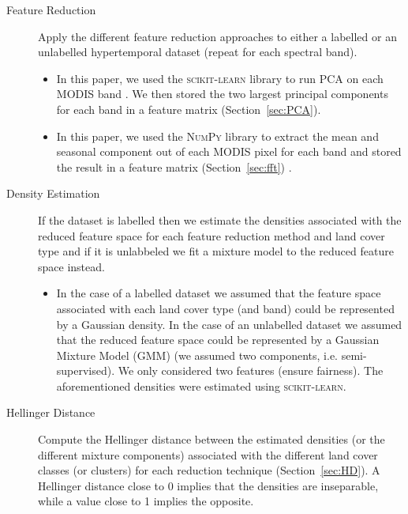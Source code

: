 \documentclass{article}
\begin{document}
\begin{description}
 \item[Feature Reduction] Apply the different feature reduction approaches to either a labelled or an unlabelled hypertemporal dataset (repeat for each spectral band). 
 \begin{itemize}
  \item In this paper, we used the \textsc{scikit-learn} library to run PCA on each MODIS band \cite{scikitlearn}. We then stored the two largest principal components for each band in a feature matrix (Section~\ref{sec:PCA}). 
  \item In this paper, we used the \textsc{NumPy} library to extract the mean and seasonal component out of each MODIS pixel for each band and stored the result in a feature matrix (Section~\ref{sec:fft}) \cite{oliphant2006}. 
 \end{itemize}
 \item[Density Estimation] If the dataset is labelled then we estimate the densities associated with the reduced feature space for each feature reduction method and land cover type and if 
 it is unlabbeled we fit a mixture model to the reduced feature space instead.
 \begin{itemize}
  \item In the case of a labelled dataset 
  we assumed that the feature space associated with each land cover type (and band) could be represented by a Gaussian density. In the case 
  of an unlabelled dataset we assumed that the reduced feature space could be represented by a Gaussian Mixture Model (GMM) (we assumed two components, i.e. semi-supervised). We only considered two features (ensure fairness). The aforementioned densities were estimated 
  using \textsc{scikit-learn}.
 \end{itemize}
 \item[Hellinger Distance] Compute the Hellinger distance between the estimated densities (or the different mixture components) associated with the different land cover classes (or clusters) for each reduction technique (Section~\ref{sec:HD}).
 A Hellinger distance close to 0 implies that the densities are inseparable, while a value close to 1 implies the opposite.
\end{description}
\end{document}
